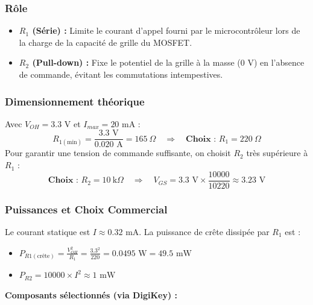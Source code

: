 \documentclass[11pt,a4paper]{article}
\begin{document}
\subsubsection{Rôle}
\begin{itemize}
    \item \textbf{$R_1$ (Série) :} Limite le courant d'appel fourni par le microcontrôleur lors de la charge de la capacité de grille du MOSFET.
    \item \textbf{$R_2$ (Pull-down) :} Fixe le potentiel de la grille à la masse ($0\text{ V}$) en l'absence de commande, évitant les commutations intempestives.
\end{itemize}

\subsubsection{Dimensionnement théorique}
Avec $V_{OH} = 3.3\text{ V}$ et $I_{max} = 20\text{ mA}$ :
\begin{equation}
    R_{1(\text{min})} = \frac{3.3\text{ V}}{0.020\text{ A}} = 165\ \Omega \quad \Rightarrow \quad \textbf{Choix : } R_1 = 220\ \Omega
\end{equation}
Pour garantir une tension de commande suffisante, on choisit $R_2$ très supérieure à $R_1$ :
\begin{equation}
    \textbf{Choix : } R_2 = 10\ \text{k}\Omega \quad \Rightarrow \quad V_{GS} = 3.3\text{ V} \times \frac{10000}{10220} \approx 3.23\text{ V}
\end{equation}

\subsubsection{Puissances et Choix Commercial}
Le courant statique est $I \approx 0.32\text{ mA}$. La puissance de crête dissipée par $R_1$ est :
\begin{itemize}
    \item $P_{R1(\text{crête})} = \frac{V_{OH}^2}{R_1} = \frac{3.3^2}{220} = 0.0495 \text{ W} = 49.5 \text{ mW}$
    \item $P_{R2} = 10000 \times I^2 \approx 1\text{ mW}$
\end{itemize}

\textbf{Composants sélectionnés (via DigiKey) : } 
\end{document}
